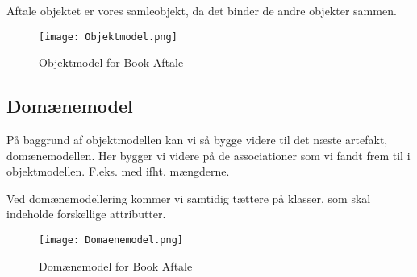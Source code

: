 Aftale objektet er vores samleobjekt, da det binder de andre objekter sammen.

\begin{sidewaysfigure}
    \caption{Objektmodel for Book Aftale}
    \centering
        \texttt{[image: Objektmodel.png]}
    \label{system:objekt}
\end{sidewaysfigure}

\subsection{Domænemodel}

På baggrund af objektmodellen kan vi så bygge videre til det næste artefakt, domænemodellen. Her bygger vi videre på de associationer som vi fandt frem til i objektmodellen. F.eks. med ifht. mængderne. 

Ved domænemodellering kommer vi samtidig tættere på klasser, som skal indeholde forskellige attributter.

\begin{figure}[H]
    \caption{Domænemodel for Book Aftale}
    \centering
        \texttt{[image: Domaenemodel.png]}
    \label{system:domaene}
\end{figure}


